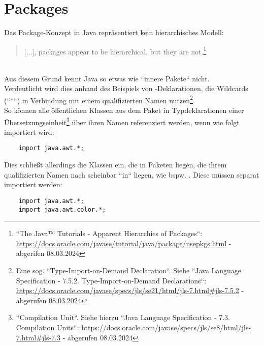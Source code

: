 \section{Packages}
Das Package-Konzept in Java repräsentiert kein hierarchisches Modell:\blockquote{
    [...], packages appear to be hierarchical, but they are not.\footnote{
        ``The Java™ Tutorials - Apparent Hierarchies of Packages``: \url{https://docs.oracle.com/javase/tutorial/java/package/usepkgs.html} - abgerifen 08.03.2024
    }
}\\
Aus diesem Grund kennt Java so etwas wie ``innere Pakete`` nicht.\\

\noindent
Verdeutlicht wird dies anhand des Beispiels von -Deklarationen, die Wildcards (``*``) in Verbindung mit einem qualifizierten Namen nutzen\footnote{
    Eine sog. ``Type-Import-on-Demand Declaration``. Siehe  ``Java Language Specification - 7.5.2. Type-Import-on-Demand Declarations``: \url{https://docs.oracle.com/javase/specs/jls/se21/html/jls-7.html#jls-7.5.2} - abgerufen 08.03.2024
}.\\
So können alle öffentlichen Klassen aus dem Paket  in Typdeklarationen einer Übersetzungseinheit\footnote{
    ``Compilation Unit``. Siehe hierzu ``Java Language Specification - 7.3. Compilation Units``: \url{https://docs.oracle.com/javase/specs/jls/se8/html/jls-7.html#jls-7.3} - abgerufen 08.03.2024
} über ihren Namen referenziert werden, wenn wie folgt importiert wird:

\begin{verbatim}
    import java.awt.*;
\end{verbatim}

\noindent
Dies schließt allerdings  die Klassen ein, die in Paketen liegen, die ihrem qualifizierten Namen nach scheinbar ``in``  liegen,
wie bspw. .
Diese müssen separat importiert werden:

\begin{verbatim}
    import java.awt.*;
    import java.awt.color.*;
\end{verbatim}